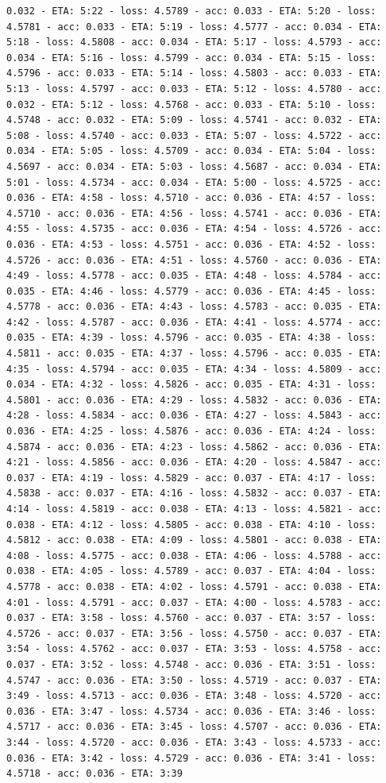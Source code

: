 \documentclass[11pt]{article}
\begin{document}
\begin{Verbatim}[commandchars=\\\{\}]
0.032 - ETA: 5:22 - loss: 4.5789 - acc: 0.033 - ETA: 5:20 - loss: 4.5781 - acc: 0.033 - ETA: 5:19 - loss: 4.5777 - acc: 0.034 - ETA: 5:18 - loss: 4.5808 - acc: 0.034 - ETA: 5:17 - loss: 4.5793 - acc: 0.034 - ETA: 5:16 - loss: 4.5799 - acc: 0.034 - ETA: 5:15 - loss: 4.5796 - acc: 0.033 - ETA: 5:14 - loss: 4.5803 - acc: 0.033 - ETA: 5:13 - loss: 4.5797 - acc: 0.033 - ETA: 5:12 - loss: 4.5780 - acc: 0.032 - ETA: 5:12 - loss: 4.5768 - acc: 0.033 - ETA: 5:10 - loss: 4.5748 - acc: 0.032 - ETA: 5:09 - loss: 4.5741 - acc: 0.032 - ETA: 5:08 - loss: 4.5740 - acc: 0.033 - ETA: 5:07 - loss: 4.5722 - acc: 0.034 - ETA: 5:05 - loss: 4.5709 - acc: 0.034 - ETA: 5:04 - loss: 4.5697 - acc: 0.034 - ETA: 5:03 - loss: 4.5687 - acc: 0.034 - ETA: 5:01 - loss: 4.5734 - acc: 0.034 - ETA: 5:00 - loss: 4.5725 - acc: 0.036 - ETA: 4:58 - loss: 4.5710 - acc: 0.036 - ETA: 4:57 - loss: 4.5710 - acc: 0.036 - ETA: 4:56 - loss: 4.5741 - acc: 0.036 - ETA: 4:55 - loss: 4.5735 - acc: 0.036 - ETA: 4:54 - loss: 4.5726 - acc: 0.036 - ETA: 4:53 - loss: 4.5751 - acc: 0.036 - ETA: 4:52 - loss: 4.5726 - acc: 0.036 - ETA: 4:51 - loss: 4.5760 - acc: 0.036 - ETA: 4:49 - loss: 4.5778 - acc: 0.035 - ETA: 4:48 - loss: 4.5784 - acc: 0.035 - ETA: 4:46 - loss: 4.5779 - acc: 0.036 - ETA: 4:45 - loss: 4.5778 - acc: 0.036 - ETA: 4:43 - loss: 4.5783 - acc: 0.035 - ETA: 4:42 - loss: 4.5787 - acc: 0.036 - ETA: 4:41 - loss: 4.5774 - acc: 0.035 - ETA: 4:39 - loss: 4.5796 - acc: 0.035 - ETA: 4:38 - loss: 4.5811 - acc: 0.035 - ETA: 4:37 - loss: 4.5796 - acc: 0.035 - ETA: 4:35 - loss: 4.5794 - acc: 0.035 - ETA: 4:34 - loss: 4.5809 - acc: 0.034 - ETA: 4:32 - loss: 4.5826 - acc: 0.035 - ETA: 4:31 - loss: 4.5801 - acc: 0.036 - ETA: 4:29 - loss: 4.5832 - acc: 0.036 - ETA: 4:28 - loss: 4.5834 - acc: 0.036 - ETA: 4:27 - loss: 4.5843 - acc: 0.036 - ETA: 4:25 - loss: 4.5876 - acc: 0.036 - ETA: 4:24 - loss: 4.5874 - acc: 0.036 - ETA: 4:23 - loss: 4.5862 - acc: 0.036 - ETA: 4:21 - loss: 4.5856 - acc: 0.036 - ETA: 4:20 - loss: 4.5847 - acc: 0.037 - ETA: 4:19 - loss: 4.5829 - acc: 0.037 - ETA: 4:17 - loss: 4.5838 - acc: 0.037 - ETA: 4:16 - loss: 4.5832 - acc: 0.037 - ETA: 4:14 - loss: 4.5819 - acc: 0.038 - ETA: 4:13 - loss: 4.5821 - acc: 0.038 - ETA: 4:12 - loss: 4.5805 - acc: 0.038 - ETA: 4:10 - loss: 4.5812 - acc: 0.038 - ETA: 4:09 - loss: 4.5801 - acc: 0.038 - ETA: 4:08 - loss: 4.5775 - acc: 0.038 - ETA: 4:06 - loss: 4.5788 - acc: 0.038 - ETA: 4:05 - loss: 4.5789 - acc: 0.037 - ETA: 4:04 - loss: 4.5778 - acc: 0.038 - ETA: 4:02 - loss: 4.5791 - acc: 0.038 - ETA: 4:01 - loss: 4.5791 - acc: 0.037 - ETA: 4:00 - loss: 4.5783 - acc: 0.037 - ETA: 3:58 - loss: 4.5760 - acc: 0.037 - ETA: 3:57 - loss: 4.5726 - acc: 0.037 - ETA: 3:56 - loss: 4.5750 - acc: 0.037 - ETA: 3:54 - loss: 4.5762 - acc: 0.037 - ETA: 3:53 - loss: 4.5758 - acc: 0.037 - ETA: 3:52 - loss: 4.5748 - acc: 0.036 - ETA: 3:51 - loss: 4.5747 - acc: 0.036 - ETA: 3:50 - loss: 4.5719 - acc: 0.037 - ETA: 3:49 - loss: 4.5713 - acc: 0.036 - ETA: 3:48 - loss: 4.5720 - acc: 0.036 - ETA: 3:47 - loss: 4.5734 - acc: 0.036 - ETA: 3:46 - loss: 4.5717 - acc: 0.036 - ETA: 3:45 - loss: 4.5707 - acc: 0.036 - ETA: 3:44 - loss: 4.5720 - acc: 0.036 - ETA: 3:43 - loss: 4.5733 - acc: 0.036 - ETA: 3:42 - loss: 4.5729 - acc: 0.036 - ETA: 3:41 - loss: 4.5718 - acc: 0.036 - ETA: 3:39 
\end{Verbatim}
\end{document}
